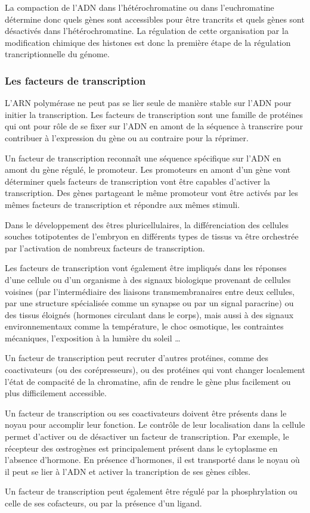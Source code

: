 \documentclass{report}
\begin{document}
La compaction de l'ADN dans l'hétérochromatine ou dans l'euchromatine détermine donc quels gènes sont accessibles pour être trancrits et quels gènes sont désactivés dans l'hétérochromatine. 
La régulation de cette organisation par la modification chimique des histones est donc la première étape de la régulation trancriptionnelle du génome. 

\subsubsection{Les facteurs de transcription}

L'ARN polymérase ne peut pas se lier seule de manière stable sur l'ADN pour initier la transcription. 
Les facteurs de transcription sont une famille de protéines qui ont pour rôle de se fixer sur l'ADN en amont de la séquence à transcrire pour contribuer à l'expression du gène ou au contraire pour la réprimer. 

Un facteur de transcription reconnaît une séquence spécifique sur l'ADN en amont du gène régulé, le promoteur. Les promoteurs en amont d'un gène vont déterminer quels facteurs de transcription vont être capables d'activer la transcription. Des gènes partageant le même promoteur vont être activés par les mêmes facteurs de transcription et répondre aux mêmes stimuli.  

Dans le développement des êtres pluricellulaires, la différenciation des cellules souches totipotentes de l'embryon en différents types de tissus va être orchestrée par l'activation de nombreux facteurs de transcription. 

Les facteurs de transcription vont également être impliqués dans les réponses d'une cellule ou d'un organisme à des signaux biologique provenant de cellules voisines (par l'intermédiaire des liaisons transmembranaires entre deux cellules, par une structure spécialisée comme un synapse ou par un signal paracrine) ou des tissus éloignés (hormones circulant dans le corps), mais aussi à des signaux environnementaux comme la température, le choc osmotique, les contraintes mécaniques, l'exposition à la lumière du soleil  \dots


Un facteur de transcription peut recruter d'autres protéines, comme des coactivateurs (ou des corépresseurs), ou des protéines qui vont changer localement l'état de compacité de la chromatine, afin de rendre le gène plus facilement ou plus difficilement accessible. 

Un facteur de transcription ou ses coactivateurs doivent être présents dans le noyau pour accomplir leur fonction. Le contrôle de leur localisation dans la cellule permet d'activer ou de désactiver un facteur de transcription. Par exemple, le récepteur des \oe strogènes est principalement présent dans le cytoplasme en l'absence d'hormone. En présence d'hormones, il est transporté dans le noyau où il peut se lier à l'ADN et activer la trancription de ses gènes cibles. 


Un facteur de transcription peut également être régulé par la phosphrylation ou celle de ses cofacteurs, ou par la présence d'un ligand. 
\end{document}
